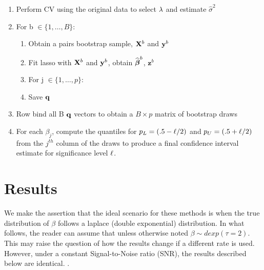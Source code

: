 \begin{enumerate}
\item Perform CV using the original data to select $\lambda$ and estimate $\hat{\sigma}^2$
\item For b $\in \lbrace 1, \ldots, B \rbrace$:
\begin{enumerate}
\item Obtain a pairs bootstrap sample, $\mathbf{X}^b$ and $\mathbf{y}^b$
\item Fit lasso with $\mathbf{X}^b$ and $\mathbf{y}^b$, obtain $\widehat{\boldsymbol{\beta}}^b$, $\boldsymbol{z}^b$
\item For j $\in \lbrace 1, \ldots, p \rbrace$:
	\begin{algorithmic}
    \EndCase
    \EndCase
    \EndCase
    \EndCase
	\EndSwitch 
	\end{algorithmic}
\item Save $\mathbf{q}$
\end{enumerate}
\item Row bind all B $\mathbf{q}$ vectors to obtain a $B \times p$ matrix of bootstrap draws
\item For each $\beta_j$, compute the quantiles for $p_L = (.5 - \ell/2)$ and $p_U = (.5 + \ell/2)$ from the $j^{th}$ column of the draws to produce a final confidence interval estimate for significance level $\ell$.
\end{enumerate}

\section{Results}

We make the assertion that the ideal scenario for these methods is when the true distribution of $\beta$ follows a laplace (double exponential) distribution. In what follows, the reader can assume that unless otherwise noted $\beta \sim dexp(\tau = 2)$. This may raise the question of how the results change if a different rate is used. However, under a constant Signal-to-Noise ratio (SNR), the results described below are identical. .

